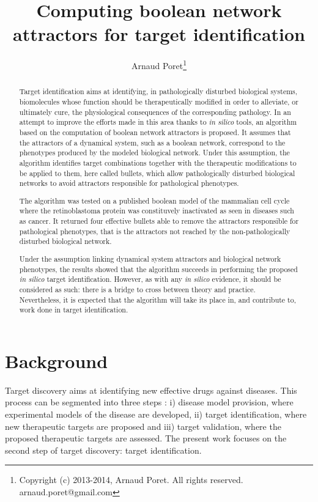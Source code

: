 \documentclass[oneside,a4paper,onecolumn,notitlepage]{article}
\title{Computing boolean network attractors for target identification}
\author{Arnaud Poret\footnote{Copyright (c) 2013-2014, Arnaud Poret. All rights reserved. arnaud.poret@gmail.com}}
\date{}
\begin{document}
\maketitle
\tableofcontents

\begin{abstract}
Target identification aims at identifying, in pathologically disturbed biological systems, biomolecules whose function should be therapeutically modified in order to alleviate, or ultimately cure, the physiological consequences of the corresponding pathology. In an attempt to improve the efforts made in this area thanks to \textit{in silico} tools, an algorithm based on the computation of boolean network attractors is proposed. It assumes that the attractors of a dynamical system, such as a boolean network, correspond to the phenotypes produced by the modeled biological network. Under this assumption, the algorithm identifies target combinations together with the therapeutic modifications to be applied to them, here called bullets, which allow pathologically disturbed biological networks to avoid attractors responsible for pathological phenotypes.

The algorithm was tested on a published boolean model of the mammalian cell cycle where the retinoblastoma protein was constituvely inactivated as seen in diseases such as cancer. It returned four effective bullets able to remove the attractors responsible for pathological phenotypes, that is the attractors not reached by the non-pathologically disturbed biological network.

Under the assumption linking dynamical system attractors and biological network phenotypes, the results showed that the algorithm succeeds in performing the proposed \textit{in silico} target identification. However, as with any \textit{in silico} evidence, it should be considered as such: there is a bridge to cross between theory and practice. Nevertheless, it is expected that the algorithm will take its place in, and contribute to, work done in target identification.
\end{abstract}

\section{Background}
Target discovery aims at identifying new effective drugs against diseases. This process can be segmented into three steps \cite{lindsay2003target}: i) disease model provision, where experimental models of the disease are developed, ii) target identification, where new therapeutic targets are proposed and iii) target validation, where the proposed therapeutic targets are assessed. The present work focuses on the second step of target discovery: target identification.
\end{document}
